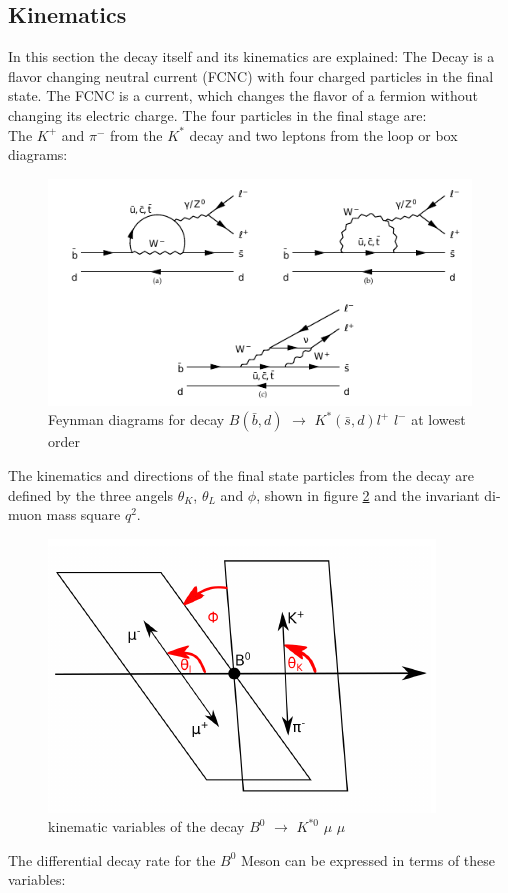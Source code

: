 \documentclass[english]{uzhpub}
\begin{document}
\subsection{Kinematics} \label{sec:Kinematics}
In this section the decay itself and its kinematics are explained:
The Decay is a flavor changing neutral current (FCNC) with four charged particles in the final state. The FCNC is a current, which changes the flavor of a fermion without changing its electric charge. The four particles in the final stage are:  \\
The $K^+$ and $\pi^-$ from the $K^{*}$ decay and two leptons from the loop or box diagrams:
\begin{figure}[H]
 \centering
 \includegraphics[width=0.8\linewidth]{KstarFeynman}
 \caption{Feynman diagrams for decay $B(\bar{b},d)$ $\rightarrow$ $ K^*(\bar{s},d) l^+$ $l^-$ at lowest order}
 \label{fig:Feynman}
\end{figure}
The kinematics and directions of the final state particles from the decay are defined by the three angels $\theta_K$, $\theta_L$ and $\phi$, shown in figure \ref{fig:angels} and the invariant di-muon mass square $q^2$.
\begin{figure}[H]
 \centering
 \includegraphics[width=0.6\linewidth]{angels}
 \caption{kinematic variables of the decay $B^0$ $\rightarrow$ $K^{*0}$ $\mu$ $\mu$}
 \label{fig:angels}
\end{figure}
The differential decay rate for the $B^0$ Meson can be expressed in terms of these variables:
\end{document}

